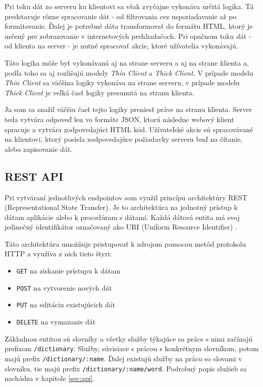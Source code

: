 \documentclass[
  digital, %
  table,   %
  lof,     %
  lot,     %
]{fithesis3}
\begin{document}
Pri toku dát zo serveru ku klientovi sa však zvyčajne vykonáva určitá logika. Tá predstavuje rôzne spracovanie dát - od filtrovania cez usporiadavanie až po formátovanie. Ďalej je potrebné dáta transformovať do formátu HTML, ktorý je určený pre zobrazovanie v internetových prehliadačoch. Pri opačnom toku dát - od klienta na server - je nutné spracovať akcie, ktoré užívatelia vykonávajú.

Táto logika môže byť vykonávaná aj na strane serveru a aj na strane klienta a, podľa toho sa aj rozlišujú modely \textit{Thin Client} a \textit{Thick Client}. V prípade modelu \textit{Thin Client} sa väčšina logiky vykonáva na strane serveru, v prípade modelu \textit{Thick Client} je veľká časť logiky presunutá na stranu klienta.

Ja som sa snažil väčšiu časť tejto logiky preniesť práve na stranu klienta. Server teda vytvára odpoveď len vo formáte JSON, ktorú následne webový klient spracuje a vytvára zodpovedajúci HTML kód. Užívateľské akcie sú spracovávané na klientovi, ktorý posiela zodpovedajúce požiadavky serveru buď na čítanie, alebo zapisovanie dát.

\subsection{REST API}
Pri vytváraní jednotlivých endpointov som využil princípu architektúry REST (Representational State Transfer). Je to architektúra na jednotný prístup k dátam aplikácie alebo k procedúram s dátami. Každá dátová entita má svoj jedinečný identifikátor označovaný ako URI (Uniform Resource Identifier) \parencite{masse2011rest}. 

Táto architektúra umožňuje pristupovať k zdrojom pomocou metód protokolu HTTP a využíva z nich tieto štyri:
\begin{itemize}
	\item \texttt{GET} na získanie prístupu k dátam
	\item \texttt{POST} na vytvorenie nových dát
	\item \texttt{PUT} na editáciu existujúcich dát
    \item \texttt{DELETE} na vymazanie dát
\end{itemize}

Základnou entitou sú slovníky a všetky služby týkajúce sa práce s nimi začínajú prefixom \texttt{/dictionary}. Služby, súvisiace s prácou s konkrétnym slovníkom, potom majú prefix \texttt{/dictionary/:name}. Ďalej existujú služby na prácu so slovami v slovníku, tie majú prefix \texttt{/dictionary/:name/word}. Podrobný popis služieb sa nachádza v kapitole \ref{sec:api}.
\end{document}
